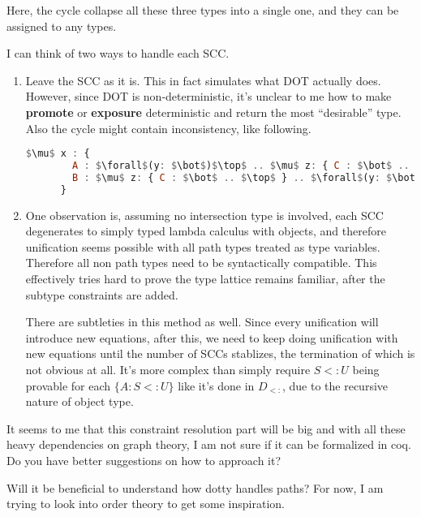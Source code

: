 \documentclass{article}
\begin{document}
\begin{enumerate}
  \linenumbers
  Here, the cycle collapse all these three types into a single one, and they can be
  assigned to any types. 

  I can think of two ways to handle each SCC.
  \begin{enumerate}
  \item Leave the SCC as it is. This in fact simulates what DOT actually does.
    However, since DOT is non-deterministic, it's unclear to me how to make
    \textbf{promote} or \textbf{exposure} deterministic and return the most
    ``desirable'' type. Also the cycle might contain inconsistency, like following.

    \nolinenumbers
    \begin{lstlisting}[language=Haskell, mathescape=true]
      $\mu$ x : {
        A : $\forall$(y: $\bot$)$\top$ .. $\mu$ z: { C : $\bot$ .. $\top$ }
        B : $\mu$ z: { C : $\bot$ .. $\top$ } .. $\forall$(y: $\bot$)$\top$
      }
    \end{lstlisting}
    \linenumbers
  \item One observation is, assuming no intersection type is involved, each SCC
    degenerates to simply typed lambda calculus with objects, and therefore
    unification seems possible with all path types treated as type
    variables. Therefore all non path types need to be syntactically compatible. This
    effectively tries hard to prove the type lattice remains familiar, after the
    subtype constraints are added.

    There are subtleties in this method as well. Since every unification will
    introduce new equations, after this, we need to keep doing unification with new
    equations until the number of SCCs stablizes, the termination of which is not
    obvious at all. It's more complex than simply require $S <: U$ being provable for
    each $\{A : S <: U\}$ like it's done in $D_{<:}$, due to the recursive nature of
    object type.
  \end{enumerate}

  It seems to me that this constraint resolution part will be big and with all these
  heavy dependencies on graph theory, I am not sure if it can be formalized in
  coq. Do you have better suggestions on how to approach it?

  Will it be beneficial to understand how dotty handles paths? For now, I am trying to
  look into order theory to get some inspiration.
  


\end{enumerate}
\end{document}
